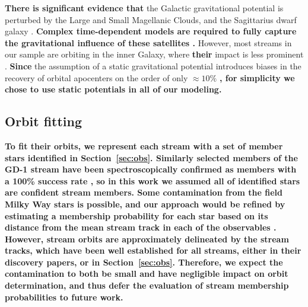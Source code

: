 \documentclass[twocolumn]{aastex63}
\newcommand{\changes}[1]{{\textbf{#1}}}
\begin{document}
\changes{There is significant evidence that} the Galactic gravitational potential is perturbed by the Large and Small Magellanic Clouds, and the Sagittarius dwarf galaxy \citep{gomez:2015, erkal:2019, vasiliev:2020}.
\changes{Complex time-dependent models are required to fully capture the gravitational influence of these satellites \citep[e.g.,][]{garavito-camargo:2020}.}
However, most streams in our sample are orbiting in the inner Galaxy, where \changes{their} impact is less prominent \citep{petersen:2020}.
\changes{Since} the assumption of a static gravitational potential introduces biases in the recovery of orbital apocenters on the order of only $\approx10\%$ \citep{garrow:2020}\changes{, for simplicity we chose to use static potentials in all of our modeling.}


\subsection{Orbit fitting}
\changes{To fit their orbits, we represent each stream with a set of member stars identified in Section~\ref{sec:obs}.
Similarly selected members of the GD-1 stream have been spectroscopically confirmed as members with a 100\% success rate \citep{bonaca:2020b}, so in this work we assumed all of identified stars are confident stream members.
Some contamination from the field Milky Way stars is possible, and our approach would be refined by estimating a membership probability for each star based on its distance from the mean stream track in each of the observables \citep[e.g.,][]{shipp:2019}.
However, stream orbits are approximately delineated by the stream tracks, which have been well established for all streams, either in their discovery papers, or in Section~\ref{sec:obs}.
Therefore, we expect the contamination to both be small and have negligible impact on orbit determination, and thus defer the evaluation of stream membership probabilities to future work.
}
\end{document}
